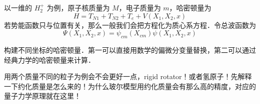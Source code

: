 
以一维的 $H_2^+$ 为例，原子核质量为 $M$，电子质量为 $m$，哈密顿量为
\begin{equation}
H = T_{N1} + T_{N2} + T_{e} + V(X_1,X_2,x)
\end{equation}
若势能函数只与位置有关，那么一般我们会把方程化为质心系方程．令总波函数为
\begin{equation}
\Psi(X_1,X_2,x) = \psi_{cm}(X_{cm})\psi(X_1,X_2,x)
\end{equation}

构建不同坐标的哈密顿量．第一可以直接用数学的偏微分变量替换，第二可以通过经典力学的哈密顿量来计算．

用两个质量不同的粒子为例会不会更好一点，rigid rotator！或者氢原子！先解释一下约化质量是怎么来的！为什么玻尔模型用约化质量会有那么高的精度，对应的量子力学原理就在这里！
